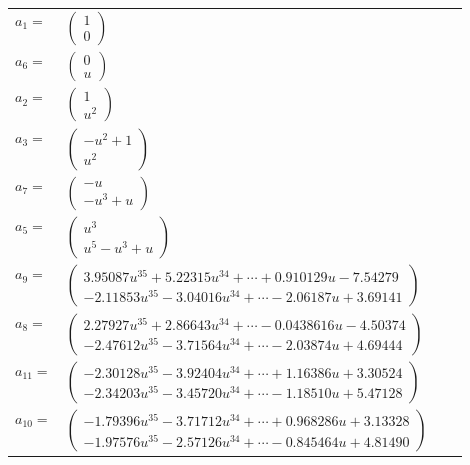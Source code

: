 \documentclass[1p]{elsarticle_modified}
\theoremstyle{definition}
\begin{document}
\begin{tabular}{m{7pt} m{180pt} m{7pt} m{180pt} }
\flushright $a_{1}=$&$\begin{pmatrix}1\\0\end{pmatrix}$ \\
\flushright $a_{6}=$&$\begin{pmatrix}0\\u\end{pmatrix}$ \\
\flushright $a_{2}=$&$\begin{pmatrix}1\\u^2\end{pmatrix}$ \\
\flushright $a_{3}=$&$\begin{pmatrix}- u^2+1\\u^2\end{pmatrix}$ \\
\flushright $a_{7}=$&$\begin{pmatrix}- u\\- u^3+u\end{pmatrix}$ \\
\flushright $a_{5}=$&$\begin{pmatrix}u^3\\u^5- u^3+u\end{pmatrix}$ \\
\flushright $a_{9}=$&$\begin{pmatrix}3.95087 u^{35}+5.22315 u^{34}+\cdots+0.910129 u-7.54279\\-2.11853 u^{35}-3.04016 u^{34}+\cdots-2.06187 u+3.69141\end{pmatrix}$ \\
\flushright $a_{8}=$&$\begin{pmatrix}2.27927 u^{35}+2.86643 u^{34}+\cdots-0.0438616 u-4.50374\\-2.47612 u^{35}-3.71564 u^{34}+\cdots-2.03874 u+4.69444\end{pmatrix}$ \\
\flushright $a_{11}=$&$\begin{pmatrix}-2.30128 u^{35}-3.92404 u^{34}+\cdots+1.16386 u+3.30524\\-2.34203 u^{35}-3.45720 u^{34}+\cdots-1.18510 u+5.47128\end{pmatrix}$ \\
\flushright $a_{10}=$&$\begin{pmatrix}-1.79396 u^{35}-3.71712 u^{34}+\cdots+0.968286 u+3.13328\\-1.97576 u^{35}-2.57126 u^{34}+\cdots-0.845464 u+4.81490\end{pmatrix}$ \\

\end{tabular}
\end{document}
